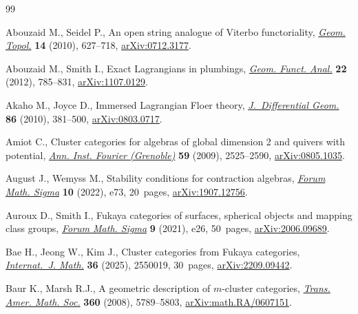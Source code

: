 \documentclass[pdftex]{sigma}
\theoremstyle{definition}
\numberwithin{equation}{section}
\begin{document}
\begin{thebibliography}{99}
\footnotesize\itemsep=0pt

Abouzaid M., Seidel P., An open string analogue of {V}iterbo functoriality,
 \href{https://doi.org/10.2140/gt.2010.14.627}{\textit{Geom. Topol.}}
 \textbf{14} (2010), 627--718,
 \href{http://arxiv.org/abs/0712.3177}{arXiv:0712.3177}.

Abouzaid M., Smith I., Exact {L}agrangians in plumbings,
 \href{https://doi.org/10.1007/s00039-012-0162-y}{\textit{Geom. Funct. Anal.}}
 \textbf{22} (2012), 785--831,
 \href{http://arxiv.org/abs/1107.0129}{arXiv:1107.0129}.

Akaho M., Joyce D., Immersed {L}agrangian {F}loer theory,
 \href{https://doi.org/10.4310/jdg/1303219427}{\textit{J.~Differential Geom.}}
 \textbf{86} (2010), 381--500,
 \href{http://arxiv.org/abs/0803.0717}{arXiv:0803.0717}.

Amiot C., Cluster categories for algebras of global dimension 2 and quivers
 with potential, \href{https://doi.org/10.5802/aif.2499}{\textit{Ann. Inst.
 Fourier (Grenoble)}} \textbf{59} (2009), 2525--2590,
 \href{http://arxiv.org/abs/0805.1035}{arXiv:0805.1035}.

August J., Wemyss M., Stability conditions for contraction algebras,
 \href{https://doi.org/10.1017/fms.2022.65}{\textit{Forum Math. Sigma}}
 \textbf{10} (2022), e73, 20~pages,
 \href{http://arxiv.org/abs/1907.12756}{arXiv:1907.12756}.

Auroux D., Smith I., Fukaya categories of surfaces, spherical objects and
 mapping class groups,
 \href{https://doi.org/10.1017/fms.2021.21}{\textit{Forum Math. Sigma}}
 \textbf{9} (2021), e26, 50~pages,
 \href{http://arxiv.org/abs/2006.09689}{arXiv:2006.09689}.

Bae H., Jeong W., Kim J., Cluster categories from {F}ukaya categories,
 \href{https://doi.org/10.1142/S0129167X25500193}{\textit{Internat.~J. Math.}}
 \textbf{36} (2025), 2550019, 30~pages,
 \href{http://arxiv.org/abs/2209.09442}{arXiv:2209.09442}.

Baur K., Marsh R.J., A geometric description of {$m$}-cluster categories,
 \href{https://doi.org/10.1090/S0002-9947-08-04441-3}{\textit{Trans. Amer.
 Math. Soc.}} \textbf{360} (2008), 5789--5803,
 \href{http://arxiv.org/abs/math.RA/0607151}{arXiv:math.RA/0607151}.


\end{thebibliography}
\end{document}
